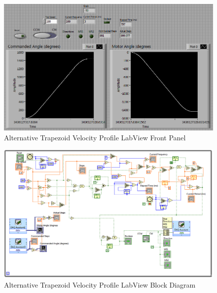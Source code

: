 \documentclass{article}
\theoremstyle{plain}
\theoremstyle{definition}
\theoremstyle{remark}
\begin{document}
\begin{figure}
\begin{center}
\includegraphics[width = 16cm]{trapezoidLabViewFront.png}
\caption{Alternative Trapezoid Velocity Profile LabView Front Panel}
\label{Q4a_Alt1}
\end{center}
\end{figure}

\begin{figure}
\begin{center}
\includegraphics[width = 16cm]{trapezoidLabViewBlock.png}
\caption{Alternative Trapezoid Velocity Profile LabView Block Diagram}
\label{Q4a_Alt2}
\end{center}
\end{figure}
\end{document}
